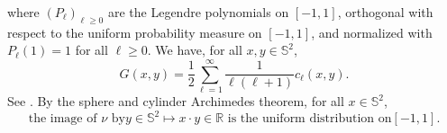 \documentclass[10pt,reqno]{amsart}
\numberwithin{equation}{section}
\numberwithin{figure}{section}
\theoremstyle{plain}
\newcommand{\<}{\langle}
\renewcommand{\>}{\rangle}
\begin{document}
where ${(P_\ell)}_{\ell\geq0}$ are the Legendre polynomials on $[-1,1]$,
orthogonal with respect to the uniform probability measure on $[-1,1]$, and
normalized with $P_\ell(1)=1$ for all $\ell\geq0$. We have, for all
$x,y\in\mathbb{S}^2$,
\begin{equation}\label{eq:green-series}
  G(x,y)
  =\frac{1}{2}\sum_{\ell=1}^\infty\frac{1}{\ell(\ell+1)}c_\ell(x,y).
\end{equation}
%
See \cite{muller1966spherical,atkinsonhan2012spherical}.
By the sphere and cylinder Archimedes theorem, for all $x\in\mathbb{S}^2$, 
\begin{equation}\label{eq:nunif}
    \text{the image of $\nu$ by
$y\in\mathbb{S}^2\mapsto x\cdot y\in\mathbb{R}$ is the uniform distribution on
$[-1,1]$}.
\end{equation}
\end{document}
